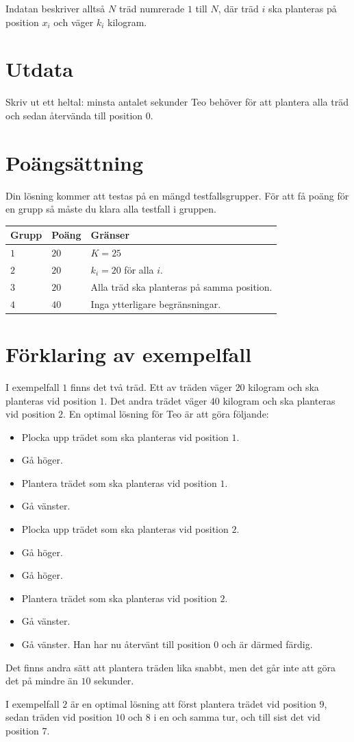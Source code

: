 Indatan beskriver alltså $N$ träd numrerade $1$ till $N$, där träd $i$ ska planteras på
position $x_i$ och väger $k_i$ kilogram.

\section*{Utdata}
Skriv ut ett heltal: minsta antalet sekunder Teo behöver för att plantera alla träd och
sedan återvända till position $0$.

\section*{Poängsättning}
Din lösning kommer att testas på en mängd testfallsgrupper.
För att få poäng för en grupp så måste du klara alla testfall i gruppen.

\noindent
\begin{tabular}{| l | l | p{12cm} |}
  \hline
  \textbf{Grupp} & \textbf{Poäng} & \textbf{Gränser} \\ \hline
  $1$    & $20$  & $K = 25$ \\ \hline
  $2$    & $20$  & $k_i = 20$ för alla $i$. \\ \hline
  $3$    & $20$  & Alla träd ska planteras på samma position. \\ \hline
  $4$    & $40$  & Inga ytterligare begränsningar. \\ \hline
\end{tabular}

\section*{Förklaring av exempelfall}
I exempelfall $1$ finns det två träd.
Ett av träden väger $20$ kilogram och ska planteras vid position $1$.
Det andra trädet väger $40$ kilogram och ska planteras vid position $2$.
En optimal lösning för Teo är att göra följande:
\begin{itemize}
  \item Plocka upp trädet som ska planteras vid position $1$.
  \item Gå höger.
  \item Plantera trädet som ska planteras vid position $1$.
  \item Gå vänster.
  \item Plocka upp trädet som ska planteras vid position $2$.
  \item Gå höger.
  \item Gå höger.
  \item Plantera trädet som ska planteras vid position $2$.
  \item Gå vänster.
  \item Gå vänster. Han har nu återvänt till position $0$ och är därmed färdig.
\end{itemize}
Det finns andra sätt att plantera träden lika snabbt, men det går inte att göra det på
mindre än $10$ sekunder.

I exempelfall $2$ är en optimal lösning att först plantera trädet vid position $9$, sedan
träden vid position $10$ och $8$ i en och samma tur, och till sist det vid position $7$.
